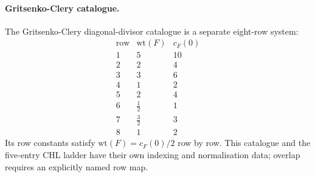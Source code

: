 \paragraph{Gritsenko-Clery catalogue.}
The Gritsenko-Clery diagonal-divisor catalogue is a separate eight-row
system:
\[
\begin{array}{c|cc}
\mathrm{row} & \mathrm{wt}(F) & c_F(0) \\ \hline
1 & 5 & 10\\
2 & 2 & 4\\
3 & 3 & 6\\
4 & 1 & 2\\
5 & 2 & 4\\
6 & \tfrac12 & 1\\
7 & \tfrac32 & 3\\
8 & 1 & 2
\end{array}
\]
Its row constants satisfy \(\mathrm{wt}(F)=c_F(0)/2\) row by row.  This
catalogue and the five-entry CHL ladder have their own indexing and
normalisation data; overlap requires an explicitly named row map.
